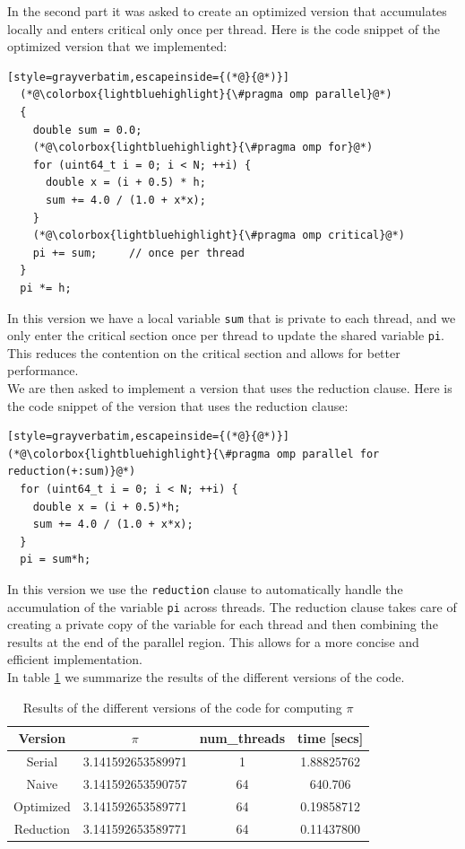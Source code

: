 \documentclass[unicode,10pt,a4paper,oneside,numbers=endperiod,openany]{scrartcl}
\begin{document}
In the second part it was asked to create an optimized version that accumulates locally and enters critical only once per thread. Here is the code snippet of the optimized version that we implemented:
\begin{lstlisting}[style=grayverbatim,escapeinside={(*@}{@*)}]
  (*@\colorbox{lightbluehighlight}{\#pragma omp parallel}@*)
  {
    double sum = 0.0;
    (*@\colorbox{lightbluehighlight}{\#pragma omp for}@*)
    for (uint64_t i = 0; i < N; ++i) {
      double x = (i + 0.5) * h;
      sum += 4.0 / (1.0 + x*x);
    }
    (*@\colorbox{lightbluehighlight}{\#pragma omp critical}@*)
    pi += sum;     // once per thread
  }
  pi *= h;
\end{lstlisting}
In this version we have a local variable \texttt{sum} that is private to each thread, and we only enter the critical section once per thread to update the shared variable \texttt{pi}. This reduces the contention on the critical section and allows for better performance.\\

We are then asked to implement a version that uses the reduction clause. Here is the code snippet of the version that uses the reduction clause:
\begin{lstlisting}[style=grayverbatim,escapeinside={(*@}{@*)}]
(*@\colorbox{lightbluehighlight}{\#pragma omp parallel for reduction(+:sum)}@*)
  for (uint64_t i = 0; i < N; ++i) {
    double x = (i + 0.5)*h;
    sum += 4.0 / (1.0 + x*x);
  }
  pi = sum*h;
\end{lstlisting}
In this version we use the \texttt{reduction} clause to automatically handle the accumulation of the variable \texttt{pi} across threads. The reduction clause takes care of creating a private copy of the variable for each thread and then combining the results at the end of the parallel region. This allows for a more concise and efficient implementation.\\
In table \ref{tab:pi_results} we summarize the results of the different versions of the code.
\begin{table}[h]
\centering
\begin{tabular}{|c|c|c|c|}
\hline
Version & $\pi$ & num\_threads & time [secs] \\
\hline
Serial & 3.141592653589971 & 1 & 1.88825762 \\
Naive & 3.141592653590757 & 64 & 640.706\\
Optimized & 3.141592653589771 & 64 & 0.19858712 \\
Reduction & 3.141592653589771 & 64 & 0.11437800 \\
\hline
\end{tabular}
\caption{Results of the different versions of the code for computing $\pi$}
\label{tab:pi_results}
\end{table}
\end{document}
